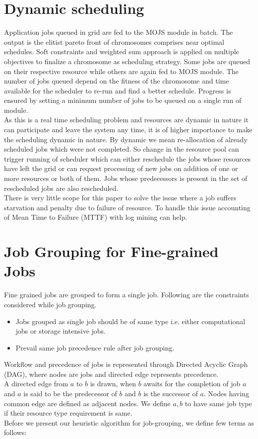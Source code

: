 \section{Dynamic scheduling}
\label{dynamicscheduling}
Application jobs queued in grid are fed to the MOJS module in batch. The output is the elitist pareto front of chromosomes comprises near optimal schedules. Soft constraints and weighted sum approach is applied on multiple objectives to finalize a chromosome as scheduling strategy. Some jobs are queued on their respective resource while others are again fed to MOJS module. The number of jobs queued depend on the fitness of the chromosome and time available for the scheduler to re-run and find a better schedule. Progress is ensured by setting a minimum number of jobs to be queued on a single run of module. \\
As this is a real time scheduling problem and resources are dynamic in nature it can participate and leave the system any time, it is of higher importance to make the scheduling dynamic in nature. By dynamic we mean re-allocation of already scheduled jobs which were not completed. So change in the resource pool can trigger running of scheduler which can either reschedule the jobs whose resources have left the grid or can request processing of new jobs on addition of one or more resources or both of them. Jobs whose predecessors is present in the set of rescheduled jobs are also rescheduled. \\
There is very little scope for this paper to solve the issue where a job suffers starvation and penalty due to failure of resource. To handle this issue accounting of Mean Time to Failure (MTTF) with log mining can help.
\section{Job Grouping for Fine-grained Jobs}
\label{jobgr}
Fine grained jobs are grouped to form a single job. Following are the constraints considered while job grouping.
\begin{itemize}
 \item Jobs grouped as single job should be of same type i.e. either computational jobs or storage intensive jobs. 
 \item Prevail same job precedence rule after job grouping.
\end{itemize}
Workflow and precedence of jobs is represented through Directed Acyclic Graph (DAG), where nodes are jobs and directed edge represents precedence. \\
A directed edge from $a$ to $b$ is drawn, when $b$ awaits for the completion of job $a$ and $a$ is said to be the predecessor of $b$ and $b$ is the successor of $a$. Nodes having common edge are defined as adjacent nodes. We define $a,b$ to have same job type if their resource type requirement is same.\\
Before we present our heuristic algorithm for job-grouping, we define few terms as follows:
